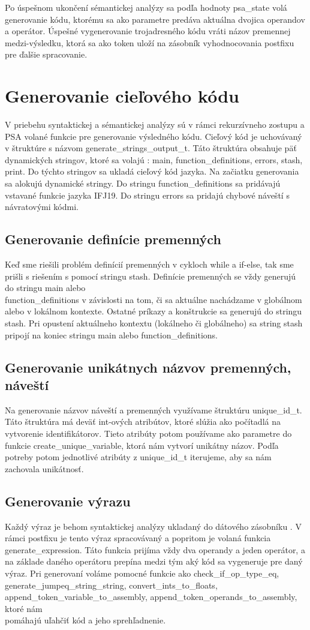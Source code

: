 \documentclass{article}
\begin{document}
	Po úspešnom ukončení sémantickej analýzy sa podľa hodnoty psa\_state volá generovanie kódu, ktorému sa ako parametre predáva aktuálna dvojica operandov a operátor. Úspešné vygenerovanie trojadresného kódu vráti názov premennej medzi-výsledku, ktorá sa ako token uloží na zásobník vyhodnocovania postfixu pre ďalšie spracovanie.
	\section{Generovanie cieľového kódu}
	V priebehu syntaktickej a sémantickej analýzy sú v rámci rekurzívneho zostupu a PSA volané funkcie pre generovanie výsledného kódu. Cieľový kód je uchovávaný v štruktúre s názvom generate\_strings\_output\_t. Táto štruktúra obsahuje päť dynamických stringov, ktoré sa volajú : main, function\_definitions, errors, stash, print. Do týchto stringov sa ukladá cieľový kód jazyka. 
	Na začiatku generovania sa alokujú dynamické stringy.  Do stringu function\_definitions sa pridávajú vstavané funkcie jazyka IFJ19. Do stringu errors sa pridajú chybové náveští s návratovými kódmi. 
	\subsection{Generovanie definície premenných}
	Keď sme riešili problém definícií premenných v cykloch while a if-else, tak sme prišli s riešením s pomocí stringu stash. Definície premenných se vždy generujú do stringu main alebo \\function\_definitions v závislosti na tom, či sa aktuálne nachádzame v globálnom alebo v  lokálnom kontexte. Ostatné príkazy a konštrukcie sa generujú do stringu stash. Pri opustení aktuálneho kontextu (lokálneho či globálneho) sa string stash pripojí na koniec stringu main alebo function\_definitions.
	\subsection{Generovanie unikátnych názvov premenných, náveští}
	Na generovanie názvov náveští a premenných využívame štruktúru unique\_id\_t. Táto štruktúra má deväť int-ových atribútov, ktoré slúžia ako počítadlá na vytvorenie identifikátorov. Tieto atribúty potom používame ako parametre do funkcie create\_unique\_variable, ktorá nám vytvorí unikátny názov. Podľa potreby potom jednotlivé atribúty z unique\_id\_t iterujeme, aby sa nám zachovala unikátnosť.
	\subsection{Generovanie výrazu}
	Každý výraz je behom syntaktickej analýzy ukladaný do dátového zásobníku . V rámci postfixu je tento výraz spracovávaný a popritom je volaná funkcia generate\_expression. Táto funkcia prijíma vždy dva operandy a jeden operátor, a na základe daného operátoru prepína medzi tým aký kód sa vygeneruje pre daný výraz. Pri generovaní voláme pomocné funkcie ako  check\_if\_op\_type\_eq, generate\_jumpeq\_string\_string, convert\_ints\_to\_floats, \\append\_token\_variable\_to\_assembly, append\_token\_operands\_to\_assembly, ktoré nám \\pomáhajú uľahčiť kód a jeho sprehľadnenie.
	
\end{document}
